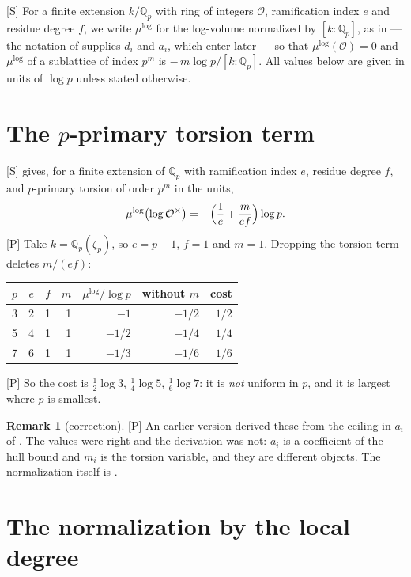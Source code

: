 \documentclass[11pt]{article}
\theoremstyle{plain}
\theoremstyle{definition}
\newtheorem{remark}{Remark}
\newcommand{\mulog}{\mu^{\log}}
\begin{document}
\textup{[S]} For a finite extension $k/\mathbb{Q}_p$ with ring of integers
$\mathcal{O}$, ramification index $e$ and residue degree $f$, we write $\mulog$ for the
log-volume normalized by $[k:\mathbb{Q}_p]$, as in \cite[Prop.~1.4(i)]{IUT4} --- the
notation of \cite[Prop.~1.1, Prop.~1.2]{IUT4} supplies $d_i$ and $a_i$, which enter
later --- so that
$\mulog(\mathcal{O})=0$ and $\mulog$ of a sublattice of index $p^{m}$ is
$-\,m\log p/[k:\mathbb{Q}_p]$.  All values below are given in units of $\log p$ unless
stated otherwise.

\section{The $p$-primary torsion term}\label{s:tors}

\textup{[S]} \cite[Prop.~1.4(ii)]{IUT4} gives, for a finite extension of
$\mathbb{Q}_p$ with ramification index $e$, residue degree $f$, and $p$-primary torsion
of order $p^{m}$ in the units,
\[
 \mulog\bigl(\log\mathcal{O}^{\times}\bigr)=-\Bigl(\frac1e+\frac{m}{ef}\Bigr)\log p .
\]
\textup{[P]} Take $k=\mathbb{Q}_p(\zeta_p)$, so $e=p-1$, $f=1$ and $m=1$.  Dropping the
torsion term deletes $m/(ef)$:

\begin{center}
\begin{tabular}{rrrrrrr}
\toprule
$p$ & $e$ & $f$ & $m$ & $\mulog/\log p$ & without $m$ & cost\\
\midrule
3 & 2 & 1 & 1 & $-1$ & $-1/2$ & $1/2$\\
5 & 4 & 1 & 1 & $-1/2$ & $-1/4$ & $1/4$\\
7 & 6 & 1 & 1 & $-1/3$ & $-1/6$ & $1/6$\\
\bottomrule
\end{tabular}
\end{center}

\textup{[P]} So the cost is $\tfrac12\log3$, $\tfrac14\log5$, $\tfrac16\log7$: it is
\emph{not} uniform in $p$, and it is largest where $p$ is smallest.

\begin{remark}[correction]\label{r:tors}
\textup{[P]} An earlier version derived these from the ceiling in $a_i$ of
\cite[Prop.~1.2]{IUT4}.  The values were right and the derivation was not: $a_i$ is a
coefficient of the hull bound and $m_i$ is the torsion variable, and they are different
objects.  The normalization itself is \cite[Prop.~1.4(i)]{IUT4}.
\end{remark}

\section{The normalization by the local degree}\label{s:norm}
\end{document}

